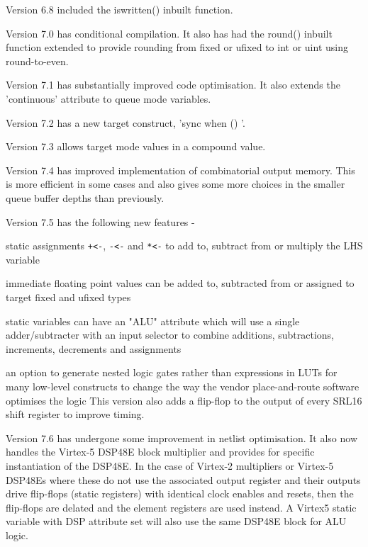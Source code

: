         Version 6.8 included the iswritten() inbuilt function.

        Version 7.0 has conditional compilation. It also has had the round()
        inbuilt function extended to provide rounding from fixed or ufixed
        to int or uint using round-to-even.

        Version 7.1 has substantially improved code optimisation. It also extends
        the 'continuous' attribute to queue mode variables.

        Version 7.2 has a new target construct, 'sync when () {}'.

        Version 7.3 allows target mode values in a compound value.

        Version 7.4 has improved implementation of combinatorial output
        memory. This is more efficient in some cases and also gives some
        more choices in the smaller queue buffer depths than previously.

        Version 7.5 has the following new features -
        \blist
        \item   static assignments \verb'+<-', \verb'-<-' and \verb'*<-' to
                add to, subtract from or multiply the LHS variable
        \item   immediate floating point values can be added to, subtracted
                from or assigned to target fixed and ufixed types
        \item   static variables can have an "ALU" attribute which will use
                a single adder/subtracter with an input selector to combine
                additions, subtractions, increments, decrements and
                assignments
        \item   an option to generate nested logic gates rather than expressions
                in LUTs for many low-level constructs to change the way
                the vendor place-and-route software optimises the logic
        \blend
        This version also adds a flip-flop to the output of every SRL16
        shift register to improve timing.

        Version 7.6 has undergone some improvement in netlist optimisation. It
        also now handles the Virtex-5 DSP48E block multiplier and provides for
        specific instantiation of the DSP48E. In the case of Virtex-2
        multipliers or Virtex-5 DSP48Es where these do not use the associated
        output register and their outputs drive flip-flops (static registers)
        with identical clock enables and resets, then the flip-flops are delated
        and the element registers are used instead. A Virtex5 static variable
        with DSP attribute set will also use the same DSP48E block for ALU
        logic.

